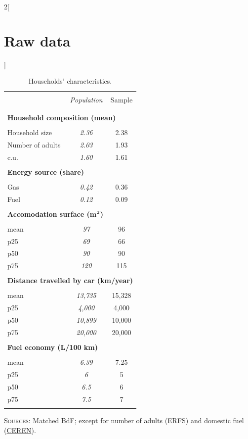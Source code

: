 \documentclass[11pt]{article}
\begin{document}
\begin{appendices}
\begin{multicols}{2}[\section{Raw data\label{sec:Raw-Data}}]
\begin{table}[H]
    \caption{Households' characteristics.\label{tab:app-energetic-characs}}
\centering
\begin{tabular}{lcc}
\hline \hline  \\[-1.8ex]
 & \emph{Population} & Sample  \tabularnewline \\[-1.8ex]
\hline  \\[-1.8ex]
\multicolumn{3}{l}{\textbf{Household composition (mean)}} \tabularnewline  \\[-1.8ex]
Household size & \emph{2.36} & 2.38\tabularnewline
Number of adults & \emph{2.03} & 1.93\tabularnewline
c.u. & \emph{1.60} & 1.61\tabularnewline
\hline   \\[-1.8ex]
\multicolumn{3}{l}{\textbf{Energy source (share)}} \tabularnewline  \\[-1.8ex]
Gas & \emph{0.42} & 0.36\tabularnewline
Fuel & \emph{0.12} & 0.09\tabularnewline
\hline   \\[-1.8ex]
\multicolumn{3}{l}{\textbf{Accomodation surface (m$^\textnormal{2}$)}} \tabularnewline  \\[-1.8ex]
mean & \emph{97} & 96\tabularnewline
p25 & \emph{69} & 66\tabularnewline
p50 & \emph{90} & 90\tabularnewline
p75 & \emph{120} & 115\tabularnewline
\hline   \\[-1.8ex]
\multicolumn{3}{l}{\textbf{Distance travelled by car (km/year)}} \tabularnewline  \\[-1.8ex]
mean & \emph{13,735} & 15,328\tabularnewline
p25 & \emph{4,000} & 4,000\tabularnewline
p50 & \emph{10,899} & 10,000 \tabularnewline
p75 & \emph{20,000 } & 20,000 \tabularnewline
\hline   \\[-1.8ex]
\multicolumn{3}{l}{\textbf{Fuel economy (L/100 km)}} \tabularnewline  \\[-1.8ex]
mean & \emph{6.39} & 7.25\tabularnewline
p25 & \emph{6} & 5\tabularnewline
p50 & \emph{6.5} & 6\tabularnewline
p75 & \emph{7.5} & 7\tabularnewline  \\[-1.8ex]
\hline \hline 
\end{tabular}\bigskip{}

     \footnotesize{\textsc{Sources:} Matched BdF; except for number of adults (ERFS) and domestic fuel (\href{https://www.lesechos.fr/industrie-services/energie-environnement/le-chauffage-au-fioul-devient-de-plus-en-plus-cher-147372}{CEREN}).} %
\end{table}


\end{multicols}
\end{appendices}
\end{document}

